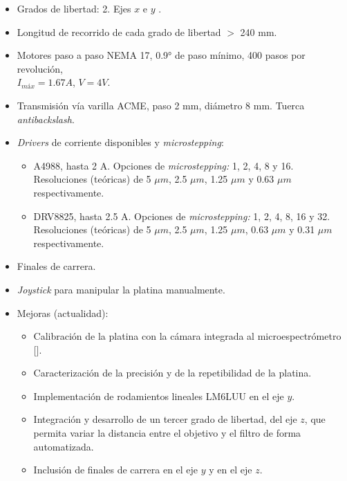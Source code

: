     \begin{itemize}
    \justifying
        \item Grados de libertad: 2. Ejes $\textit{x}$ e $\textit{y}$  .
        \item Longitud de recorrido de cada grado de libertad $>$ 240 mm.
        \item Motores paso a paso NEMA 17, 0.9° de paso mínimo, 400 pasos por revolución, \\ $I_{máx} = 1.67 A$, $V = 4V$.
        \item Transmisión vía varilla ACME, paso 2 mm, diámetro 8 mm. Tuerca \textit{antibackslash}.
        \item \textit{Drivers} de corriente disponibles y \textit{microstepping}:
\begin{itemize}
\item A4988, hasta 2 A. Opciones de \textit{microstepping:} 1, 2, 4, 8 y 16. \\ Resoluciones (teóricas) de 5 $\mu m$, 2.5 $\mu m$, 1.25 $\mu m$ y 0.63 $\mu m$ respectivamente.
\item DRV8825, hasta 2.5 A. Opciones de \textit{microstepping:} 1, 2, 4, 8, 16 y 32. \\ Resoluciones (teóricas) de 5 $\mu m$, 2.5 $\mu m$, 1.25 $\mu m$, 0.63 $\mu m$ y 0.31 $\mu m$ respectivamente. 
\end{itemize}
\item Finales de carrera.
\item \textit{Joystick} para manipular la platina manualmente.
    \item Mejoras (actualidad):
    \begin{itemize}
 	\item Calibración de la platina con la cámara integrada al microespectrómetro [\cite{schaa}].
 	\item Caracterización de la precisión y de la repetibilidad de la platina.
        \item Implementación de rodamientos lineales LM6LUU en el eje $\textit{y}$.
        \item Integración y desarrollo de un tercer grado de libertad, del eje $\textit{z}$, que permita variar la distancia entre el objetivo y el filtro de forma automatizada.
        \item Inclusión de finales de carrera en el eje $\textit{y}$ y en el eje $\textit{z}$. 
        \end{itemize}
\end{itemize}